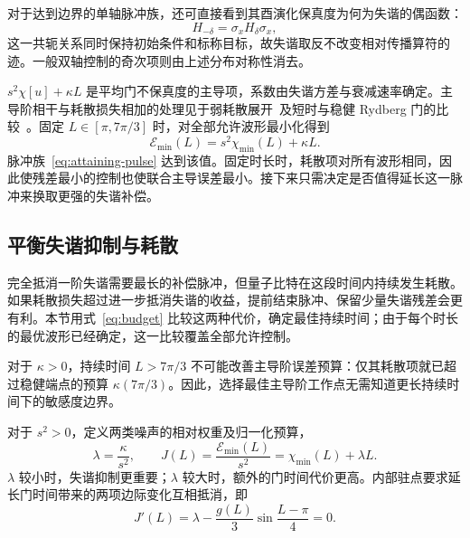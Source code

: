 \documentclass[12pt]{iopjournal}
\theoremstyle{definition}
\begin{document}
对于达到边界的单轴脉冲族，还可直接看到其酉演化保真度为何为失谐的偶函数：
\begin{equation*}
 H_{-\delta}=\sigma_xH_\delta\sigma_x,
\end{equation*}
这一共轭关系同时保持初始条件和标称目标，故失谐取反不改变相对传播算符的迹。一般双轴控制的奇次项则由上述分布对称性消去。

$s^2\chi[u]+\kappa L$ 是平均门不保真度的主导项，系数由失谐方差与衰减速率确定。主导阶相干与耗散损失相加的处理见于弱耗散展开~\cite{abad2022}及短时与稳健 Rydberg 门的比较~\cite{fromonteil2023}。固定 $L\in[\pi,7\pi/3]$ 时，对全部允许波形最小化得到
\begin{equation}
 \boxed{\mathcal E_{\min}(L)=s^2\chi_{\min}(L)+\kappa L.}
 \label{eq:budget}
\end{equation}
脉冲族~\eqref{eq:attaining-pulse} 达到该值。固定时长时，耗散项对所有波形相同，因此使残差最小的控制也使联合主导误差最小。接下来只需决定是否值得延长这一脉冲来换取更强的失谐补偿。



\FloatBarrier
\subsection{平衡失谐抑制与耗散}

完全抵消一阶失谐需要最长的补偿脉冲，但量子比特在这段时间内持续发生耗散。如果耗散损失超过进一步抵消失谐的收益，提前结束脉冲、保留少量失谐残差会更有利。本节用式~\eqref{eq:budget} 比较这两种代价，确定最佳持续时间；由于每个时长的最优波形已经确定，这一比较覆盖全部允许控制。

对于 $\kappa>0$，持续时间 $L>7\pi/3$ 不可能改善主导阶误差预算：仅其耗散项就已超过稳健端点的预算 $\kappa(7\pi/3)$。因此，选择最佳主导阶工作点无需知道更长持续时间下的敏感度边界。

对于 $s^2>0$，定义两类噪声的相对权重及归一化预算，
\begin{equation*}
 \lambda=\frac{\kappa}{s^2},\qquad
 J(L)=\frac{\mathcal E_{\min}(L)}{s^2}
     =\chi_{\min}(L)+\lambda L.
\end{equation*}
$\lambda$ 较小时，失谐抑制更重要；$\lambda$ 较大时，额外的门时间代价更高。内部驻点要求延长门时间带来的两项边际变化互相抵消，即
\begin{equation}
 J'(L)=\lambda-\frac{g(L)}{3}\sin\frac{L-\pi}{4}=0.
 \label{eq:working-point}
\end{equation}
\end{document}
